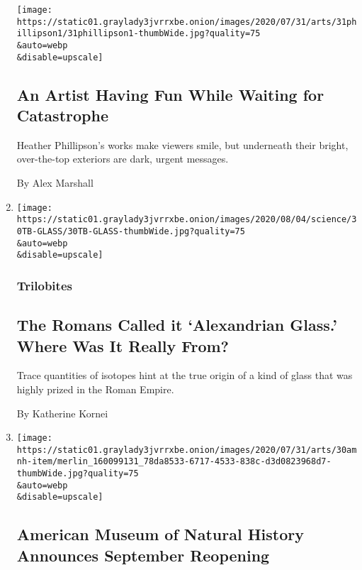 \begin{enumerate}
  \texttt{[image: https://static01.graylady3jvrrxbe.onion/images/2020/07/31/arts/31phillipson1/31phillipson1-thumbWide.jpg?quality=75\\\&auto=webp\\\&disable=upscale]}

  \hypertarget{an-artist-having-fun-while-waiting-for-catastrophe}{%
  \subsection{An Artist Having Fun While Waiting for
  Catastrophe}\label{an-artist-having-fun-while-waiting-for-catastrophe}}

  Heather Phillipson's works make viewers smile, but underneath their
  bright, over-the-top exteriors are dark, urgent messages.

  By Alex Marshall
\item
  \href{/2020/07/31/science/alexandrian-glass-rome.html}{}

  \texttt{[image: https://static01.graylady3jvrrxbe.onion/images/2020/08/04/science/30TB-GLASS/30TB-GLASS-thumbWide.jpg?quality=75\\\&auto=webp\\\&disable=upscale]}

  \hypertarget{trilobites}{%
  \subsubsection{Trilobites}\label{trilobites}}

  \hypertarget{the-romans-called-it-alexandrian-glass-where-was-it-really-from}{%
  \subsection{The Romans Called it `Alexandrian Glass.' Where Was It
  Really
  From?}\label{the-romans-called-it-alexandrian-glass-where-was-it-really-from}}

  Trace quantities of isotopes hint at the true origin of a kind of
  glass that was highly prized in the Roman Empire.

  By Katherine Kornei
\item
  \href{/2020/07/30/arts/design/american-museum-of-natural-history-reopen-covid.html}{}

  \texttt{[image: https://static01.graylady3jvrrxbe.onion/images/2020/07/31/arts/30amnh-item/merlin\_160099131\_78da8533-6717-4533-838c-d3d0823968d7-thumbWide.jpg?quality=75\\\&auto=webp\\\&disable=upscale]}

  \hypertarget{american-museum-of-natural-history-announces-september-reopening}{%
  \subsection{American Museum of Natural History Announces September
  Reopening}\label{american-museum-of-natural-history-announces-september-reopening}}


\end{enumerate}
